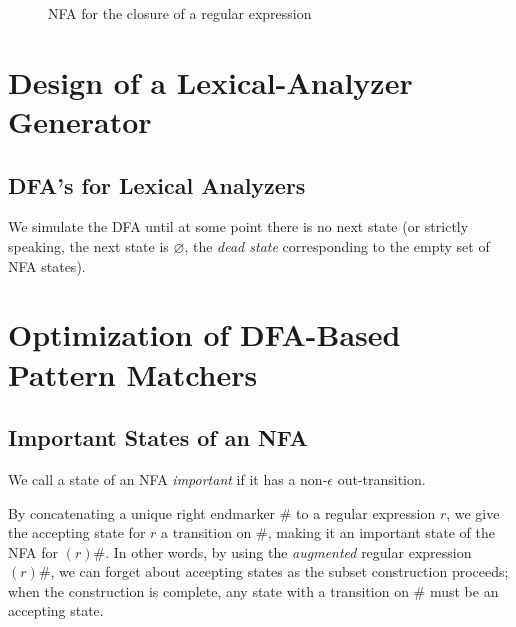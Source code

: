 \documentclass[a4paper,twoside]{book}
\begin{document}
\begin{figure}[htbp]
    \centering
    \caption{NFA for the closure of a regular expression}
    \label{Figure:3.42}
\end{figure}

\section{Design of a Lexical-Analyzer Generator}
\subsection{DFA's for Lexical Analyzers}

We simulate the DFA until at some point there is no next state (or strictly speaking, the next state is $\varnothing$, the \textit{dead state} corresponding to the empty set of NFA states).

\section{Optimization of DFA-Based Pattern Matchers}
\subsection{Important States of an NFA}

We call a state of an NFA \textit{important} if it has a non-$\epsilon$ out-transition.

By concatenating a unique right endmarker $\#$ to a regular expression $r$, we give the accepting state for $r$ a transition on $\#$, making it an important state of the NFA for $(r)\#$. In other words, by using the \textit{augmented} regular expression $(r)\#$, we can forget about accepting states as the subset construction proceeds; when the construction is complete, any state with a transition on $\#$ must be an accepting state.
\end{document}
